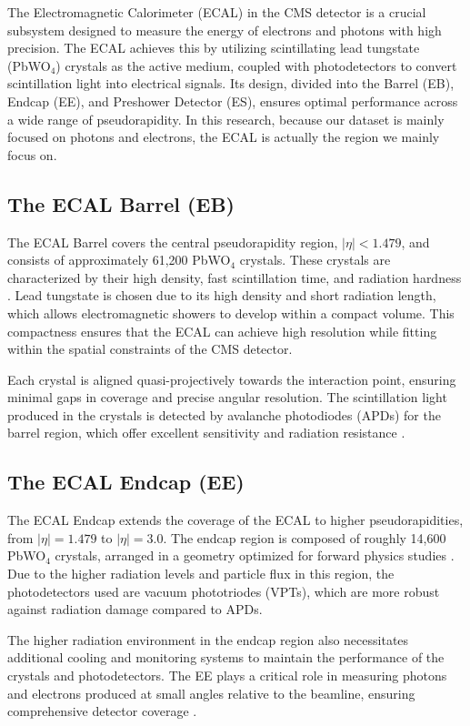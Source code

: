 The Electromagnetic Calorimeter (ECAL) in the CMS detector is a crucial subsystem designed to measure the energy of electrons and photons with high precision. The ECAL achieves this by utilizing scintillating lead tungstate (PbWO$_4$) crystals as the active medium, coupled with photodetectors to convert scintillation light into electrical signals. Its design, divided into the Barrel (EB), Endcap (EE), and Preshower Detector (ES), ensures optimal performance across a wide range of pseudorapidity. In this research, because our dataset is mainly focused on photons and electrons, the ECAL is actually the region we mainly focus on. 

\subsection{The ECAL Barrel (EB)}
The ECAL Barrel covers the central pseudorapidity region, $|\eta| < 1.479$, and consists of approximately 61,200 PbWO$_4$ crystals. These crystals are characterized by their high density, fast scintillation time, and radiation hardness \cite{ecal_tdr}. Lead tungstate is chosen due to its high density and short radiation length, which allows electromagnetic showers to develop within a compact volume. This compactness ensures that the ECAL can achieve high resolution while fitting within the spatial constraints of the CMS detector.

Each crystal is aligned quasi-projectively towards the interaction point, ensuring minimal gaps in coverage and precise angular resolution. The scintillation light produced in the crystals is detected by avalanche photodiodes (APDs) for the barrel region, which offer excellent sensitivity and radiation resistance \cite{ecal_tdr}.

\subsection{The ECAL Endcap (EE)}
The ECAL Endcap extends the coverage of the ECAL to higher pseudorapidities, from $|\eta| = 1.479$ to $|\eta| = 3.0$. The endcap region is composed of roughly 14,600 PbWO$_4$ crystals, arranged in a geometry optimized for forward physics studies \cite{ecal_tdr}. Due to the higher radiation levels and particle flux in this region, the photodetectors used are vacuum phototriodes (VPTs), which are more robust against radiation damage compared to APDs.

The higher radiation environment in the endcap region also necessitates additional cooling and monitoring systems to maintain the performance of the crystals and photodetectors. The EE plays a critical role in measuring photons and electrons produced at small angles relative to the beamline, ensuring comprehensive detector coverage \cite{ecal_tdr}.

